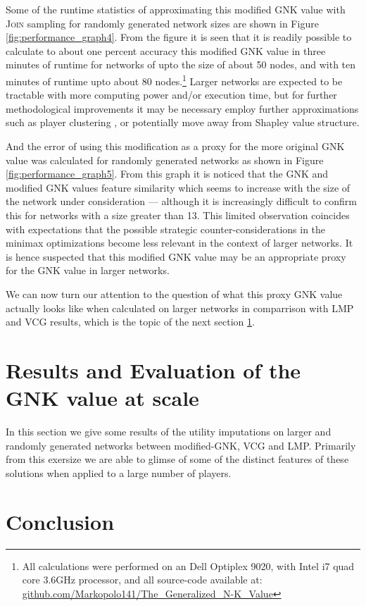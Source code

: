Some of the runtime statistics of approximating this modified GNK value with \textsc{Join} sampling for randomly generated network sizes are shown in Figure \ref{fig:performance_graph4}.
From the figure it is seen that it is readily possible to calculate to about one percent accuracy this modified GNK value in three minutes of runtime for networks of upto the size of about 50 nodes, and with ten minutes of runtime upto about 80 nodes.\footnote{\label{note1} All calculations were performed on an Dell Optiplex 9020, with Intel i7 quad core 3.6GHz processor, and all source-code available at:\\
\href{https://github.com/Markopolo141/The\_Generalized\_N-K\_Value}{github.com/Markopolo141/The\_Generalized\_N-K\_Value}}
Larger networks are expected to be tractable with more computing power and/or execution time, but for further methodological improvements it may be necessary employ further approximations such as player clustering \cite{DBLP:journals/corr/abs-1903-10965}, or potentially move away from Shapley value structure.

And the error of using this modification as a proxy for the more original GNK value was calculated for randomly generated networks as shown in Figure \ref{fig:performance_graph5}.
From this graph it is noticed that the GNK and modified GNK values feature similarity which seems to increase with the size of the network under consideration --- although it is increasingly difficult to confirm this for networks with a size greater than 13.
This limited observation coincides with expectations that the possible strategic counter-considerations in the minimax optimizations become less relevant in the context of larger networks.
It is hence suspected that this modified GNK value may be an appropriate proxy for the GNK value in larger networks.

We can now turn our attention to the question of what this proxy GNK value actually looks like when calculated on larger networks in comparrison with LMP and VCG results, which is the topic of the next section \ref{sec:results_and_evaluation_of_GNK}.

\iffigures

\fi

\iffigures

\fi



\section{Results and Evaluation of the GNK value at scale}\label{sec:results_and_evaluation_of_GNK}

In this section we give some results of the utility imputations on larger and randomly generated networks between modified-GNK, VCG and LMP.
Primarily from this exersize we are able to glimse of some of the distinct features of these solutions when applied to a large number of players.


\section{Conclusion}


